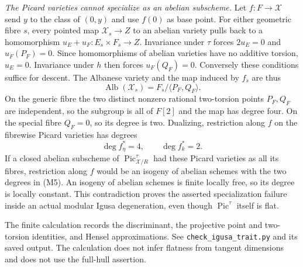 \emph{The Picard varieties cannot specialize as an abelian subscheme.}
Let $f:F\to\mathcal X$ send $y$ to the class of $(0,y)$ and use
$f(0)$ as base point. For either geometric fibre $s$, every pointed
map $\mathcal X_s\to Z$ to an abelian variety pulls back to a
homomorphism $u_E+u_F:E_s\times F_s\to Z$. Invariance under $\tau$
forces $2u_E=0$ and $u_F(P_F)=0$. Since homomorphisms of abelian
varieties have no additive torsion, $u_E=0$. Invariance under $h$
then forces $u_F(Q_F)=0$. Conversely these conditions suffice for
descent. The Albanese variety and the map induced by $f_s$ are thus
\[
 \operatorname{Alb}(\mathcal X_s)=
 F_s/\langle P_F,Q_F\rangle.
\]
On the generic fibre the two distinct nonzero rational two-torsion
points $P_F,Q_F$ are independent, so the subgroup is all of $F[2]$
and the map has degree four. On the special fibre $Q_F=0$, so its
degree is two. Dualizing, restriction along $f$ on the fibrewise
Picard varieties has degrees
\[
 \deg f_\eta^*=4,\qquad \deg f_k^*=2.                    \tag{M5}
\]
If a closed abelian subscheme of
$\operatorname{Pic}^{\tau}_{\mathcal X/R}$ had these Picard varieties
as all its fibres, restriction along $f$ would be an isogeny of
abelian schemes with the two degrees in (M5). An isogeny of abelian
schemes is finite locally free, so its degree is locally constant.
This contradiction proves the asserted specialization failure
inside an actual modular Igusa degeneration, even though
$\operatorname{Pic}^{\tau}$ itself is flat.

The finite calculation records the discriminant, the projective
point and two-torsion identities, and Hensel approximations. See
\texttt{check\_igusa\_trait.py} and its saved output. The calculation
does not infer flatness from tangent dimensions and does not use
the full-hull assertion.
